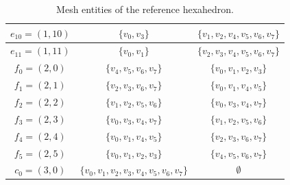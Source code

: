 \begin{table}[H]
\begin{center}
\begin{tabular}{|c|c|c|}
      \hline
      $e_{10} = (1, 10)$ & $\{v_0, v_3\}$ & $\{v_1, v_2, v_4, v_5, v_6, v_7\}$ \\
      \hline
      $e_{11} = (1, 11)$ & $\{v_0, v_1\}$ & $\{v_2, v_3, v_4, v_5, v_6, v_7\}$ \\
      \hline
      $f_0 = (2, 0)$ & $\{v_4, v_5, v_6, v_7\}$ & $\{v_0, v_1, v_2, v_3\}$ \\
      \hline
      $f_1 = (2, 1)$ & $\{v_2, v_3, v_6, v_7\}$ & $\{v_0, v_1, v_4, v_5\}$ \\
      \hline
      $f_2 = (2, 2)$ & $\{v_1, v_2, v_5, v_6\}$ & $\{v_0, v_3, v_4, v_7\}$ \\
      \hline
      $f_3 = (2, 3)$ & $\{v_0, v_3, v_4, v_7\}$ & $\{v_1, v_2, v_5, v_6\}$ \\
      \hline
      $f_4 = (2, 4)$ & $\{v_0, v_1, v_4, v_5\}$ & $\{v_2, v_3, v_6, v_7\}$ \\
      \hline
      $f_5 = (2, 5)$ & $\{v_0, v_1, v_2, v_3\}$ & $\{v_4, v_5, v_6, v_7\}$ \\
      \hline
      $c_0 = (3, 0)$ & $\{v_0, v_1, v_2, v_3, v_4, v_5, v_6, v_7\}$ & $\emptyset$ \\
      \hline
    \end{tabular}
    \caption{Mesh entities of the reference hexahedron.}
    \label{tab:hexahedron,entities}
  \end{center}
\end{table}
